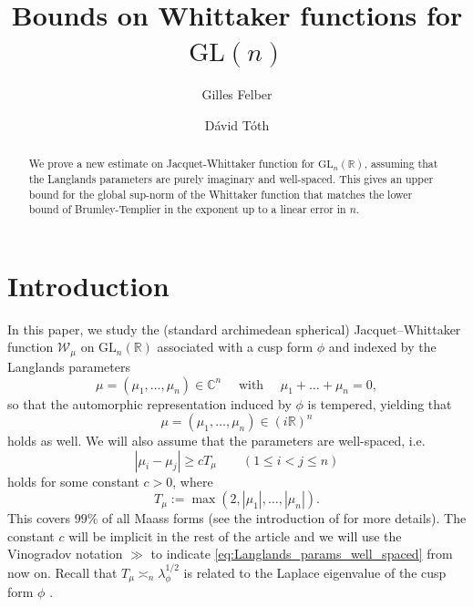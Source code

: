 \documentclass[11pt, oneside]{amsart}
\theoremstyle{plain}
\theoremstyle{remark}
\newcommand{\R}{\mathbb{R}}
\newcommand{\C}{\mathbb{C}}
\renewcommand{\C}{\mathbb{C}}
\begin{document}

\title{Bounds on Whittaker functions for $\mathrm{GL}(n)$}

\author{Gilles Felber}
\address[G. Felber and D. T\'oth]{HUN-REN Alfr\'ed R\'enyi Institute of Mathematics,
Budapest, Hungary}
\author{D\'avid
T\'oth}
\address[D. T\'oth]{
Department of Algebra and Geometry,  Institute of Mathematics,
Budapest University of Technology and Economics,
M\H{u}egyetem rkp.\ 3, H-1111 Budapest, Hungary}

\begin{abstract}
We prove a new estimate on Jacquet-Whittaker function for $\mathrm{GL}_n(\mathbb R)$, assuming that the Langlands parameters are purely imaginary and well-spaced. This gives an upper bound for the global sup-norm of the Whittaker function that matches the lower bound of Brumley-Templier in the exponent up to a linear error in $n$.
\end{abstract}

\maketitle



\section{Introduction}\label{sec:introduction}


In this paper, we study
the (standard archimedean spherical)
Jacquet–Whittaker function $\mathcal W_\mu$ on $\mathrm{GL}_n(\R)$ associated with a 
cusp form $\phi$
and indexed by the Langlands parameters
\begin{equation}\label{eq:Langlands_params}
\mu=(\mu_1,\dots,\mu_n)\in \C^n\quad\textrm{ with }\quad\mu_1+\dots+\mu_n=0,    
\end{equation}
 so that the automorphic representation induced by $\phi$ is tempered,
 yielding that
 \begin{equation}\label{eq:Langlands_params_tempered}
     \mu=(\mu_1,\dots,\mu_n)\in (i\R)^n
 \end{equation}
 holds as well.
We will also assume that the parameters are well-spaced, i.e.\ 
\begin{equation}\label{eq:Langlands_params_well_spaced}
|\mu_i-\mu_j|\geq cT_\mu\qquad (1\leq i<j\leq n)    
\end{equation}
holds for some constant $c>0$, where 
\begin{equation}\label{eq:T_mu_def}
T_\mu:=\max(2,|\mu_1|,\dots,|\mu_n|).
\end{equation}
This covers $99\%$ of all Maass forms (see the introduction of \cite{BB20} for more details).
The constant $c$ will be implicit in the rest of the article and we will use the Vinogradov notation $\gg$ to indicate 
\eqref{eq:Langlands_params_well_spaced}
from now on.  Recall that $T_\mu\asymp_n\lambda_\phi^{1/2}$ is related to the Laplace eigenvalue of the cusp form $\phi$ \cite[Equation (7)]{BHM20}.
\end{document}
